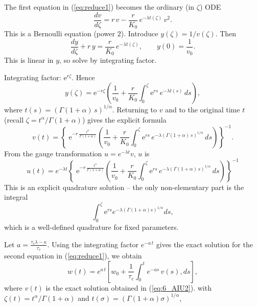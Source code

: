 \documentclass{article}
\begin{document}
\begin{description}
The first equation in (\ref{eq:reduce1}) becomes the ordinary (in $\zeta$) ODE
\begin{equation*}
\frac{dv}{d\zeta}=r\,v - \frac{r}{K_0}\,e^{-\lambda t(\zeta)}\,v^2.
\end{equation*}
This is a Bernoulli equation (power $2$). Introduce $y(\zeta)=1/v(\zeta)$. Then
\begin{equation*}
\frac{dy}{d\zeta}+ r\,y = \frac{r}{K_0}\,e^{-\lambda t(\zeta)},\qquad y(0)=\frac{1}{v_0}.
\end{equation*}
This is linear in $y$, so solve by integrating factor. 
\par 
Integrating factor: $\mathrm{e}^{r\zeta}$. Hence
\begin{equation*}
y(\zeta)=\mathrm{e}^{-r\zeta}\left(\frac{1}{v_0}+\frac{r}{K_0}\int_{0}^{\zeta}\mathrm{e}^{r s}\,e^{-\lambda t(s)}\,ds\right),
\end{equation*}
where $t(s)=(\Gamma(1+\alpha)\,s)^{1/\alpha}$. Returning to $v$ and to the original time $t$ (recall $\zeta=t^{\alpha}/\Gamma(1+\alpha)$) gives the explicit formula
\begin{equation*}
v(t)=\left\{\; \mathrm{e}^{-r\,\frac{t^\alpha}{\Gamma(1+\alpha)}}\!\left(\frac{1}{v_0}+\frac{r}{K_0}\int_{0}^{\zeta}\mathrm{e}^{r s}\,e^{-\lambda(\Gamma(1+\alpha)\,s)^{1/\alpha}}\,ds\right)\right\}^{-1}.
\end{equation*}
From the gauge transformation $u=e^{-\lambda t}v$, $u$ is
\begin{equation}\label{eq:6_AIU2}
u(t)=e^{-\lambda t}\left\{\; \mathrm{e}^{-r\,\frac{t^\alpha}{\Gamma(1+\alpha)}}\!\left(\frac{1}{v_0}+\frac{r}{K_0}\int_{0}^{\zeta}\mathrm{e}^{r s}\,e^{-\lambda(\Gamma(1+\alpha)\,s)^{1/\alpha}}\,ds\right)\right\}^{-1}
\end{equation}
This is an explicit quadrature solution -- the only non-elementary part is the integral
\begin{equation*}
\displaystyle \int_{0}^{\zeta}\mathrm{e}^{r s}e^{-\lambda(\Gamma(1+\alpha)s)^{1/\alpha}}ds,
\end{equation*}
which is a well-defined quadrature for fixed parameters.
\par 
Let $a=\frac{\tau_c\lambda-\kappa}{\tau_c}$. Using the integrating factor $e^{-a\,t}$ gives the exact solution for the second equation in (\ref{eq:reduce1}), we obtain
\begin{equation}\label{eq:CaseI_c1}
w(t)=e^{a\, t}\left[w_0+\frac{1}{\tau_c}\int_{0}^{t} e^{-a s}\,v(s),ds\right],
\end{equation}
where $v(t)$ is the exact solution obtained in (\ref{eq:6_AIU2}). with $\zeta(t)=t^\alpha/\Gamma(1+\alpha)$ and $t(\sigma)=(\Gamma(1+\alpha)\sigma)^{1/\alpha}$,

\end{description}
\end{document}
